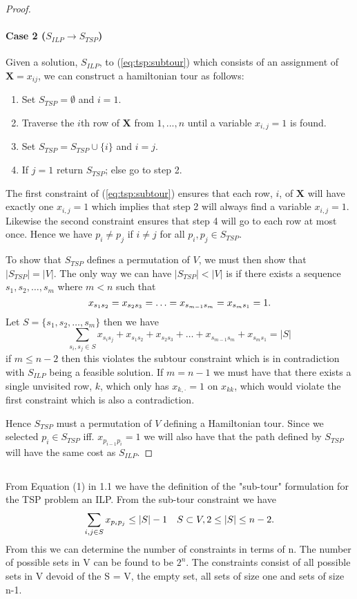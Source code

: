 \documentclass[11pt,a4paper,english]{article}
\begin{document}
\begin{proof}
 \paragraph{Case 2 ($S_{ILP} \to S_{TSP}$)}
 Given a solution, $S_{ILP}$, to (\ref{eq:tsp:subtour}) which consists of an assignment of $\bm X = x_{ij}$, we can construct a hamiltonian tour as follows:
 \begin{enumerate}
 \item Set $S_{TSP} = \emptyset$ and $i = 1$.
 \item Traverse the $i$th row of $\bm X$ from $1,...,n$ until a variable $x_{i,j} = 1$ is found.
 \item Set $S_{TSP} = S_{TSP} \cup \{i\}$ and $i = j$.
 \item If $j = 1$ return $S_{TSP}$; else go to step 2.
 \end{enumerate}
 The first constraint of (\ref{eq:tsp:subtour}) ensures that each row, $i$,
 of $\bm X$ will
 have exactly one $x_{i,j} = 1$ which implies that step 2 will always find a
 variable $x_{i,j} = 1$. Likewise the second constraint ensures that step 4 will
 go to each row at most once. Hence we have $p_i \neq p_j$  if $i \neq j$
 for all $p_i, p_j \in S_{TSP}$.

 To show that $S_{TSP}$ defines a permutation of $V$, we must then show that
 $|S_{TSP}| = |V|$. The only way we can have $|S_{TSP}| < |V|$ is if there
 exists a sequence $s_1, s_2, \ldots, s_m$ where $m < n$ such that
 $$x_{s_1 s_2} = x_{s_2 s_3} = \ldots = x_{s_{m-1} s_m} =  x_{s_{m} s_1} =  1\mathnormal{.}$$
 Let $S = \{s_1, s_2, \ldots, s_m \}$ then we have
 $$\sum_{s_i, s_j\in S} x_{s_i s_j} + x_{s_1 s_2} + x_{s_2 s_3} + \ldots + x_{s_{m-1} s_m} +  x_{s_{m} s_1} = |S|$$
 if $m \leq n-2$ then this violates the subtour constraint which is in contradiction
  with $S_{ILP}$ being a feasible solution. If $m = n -1$ we
 must have that there exists a single unvisited row, $k$, which only has
 $x_{k,\cdot} = 1$ on $x_{kk}$, which would violate the first constraint which is
 also a contradiction.

 Hence $S_{TSP}$ must a permutation of $V$ defining a Hamiltonian tour. Since
 we selected $p_i \in S_{TSP}$ iff. $x_{p_{i-1} p_i} = 1$ we will also have that
  the path defined by $S_{TSP}$ will have the same cost as $S_{ILP}$.
 \end{proof}

\subsection{}
From Equation (1) in 1.1 we have the definition of the "sub-tour" formulation for the TSP problem an ILP. From the sub-tour constraint we have 
$$\sum_{i,j \in S} x_{p_i p_j} \leq |S| - 1 \quad S \subset V, 2 \leq |S| \leq n-2\mathnormal{.}$$
From this we can determine the number of constraints in terms of n.
The number of possible sets in V can be found to be $2^n$. 
The constraints consist of all possible sets in V devoid of the S = V, the empty set, all sets of size one and sets of size n-1. 
\end{document}
